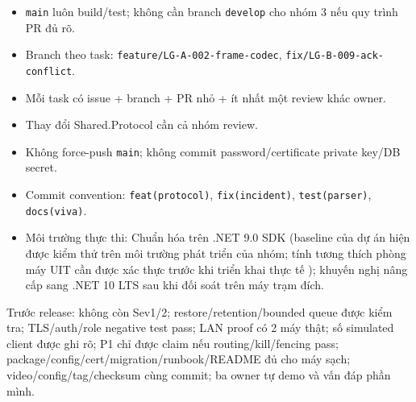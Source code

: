 \begin{itemize}
    \item \texttt{main} luôn build/test; không cần branch \texttt{develop} cho nhóm 3 nếu quy trình PR đủ rõ.
    \item Branch theo task: \texttt{feature/LG-A-002-frame-codec}, \texttt{fix/LG-B-009-ack-conflict}.
    \item Mỗi task có issue + branch + PR nhỏ + ít nhất một review khác owner.
    \item Thay đổi Shared.Protocol cần cả nhóm review.
    \item Không force-push \texttt{main}; không commit password/certificate private key/DB secret.
    \item Commit convention: \texttt{feat(protocol)}, \texttt{fix(incident)}, \texttt{test(parser)}, \texttt{docs(viva)}.
    \item Môi trường thực thi: Chuẩn hóa trên .NET 9.0 SDK (baseline của dự án hiện được kiểm thử trên môi trường phát triển của nhóm; tính tương thích phòng máy UIT cần được xác thực trước khi triển khai thực tế \cite{mslearn_dotnet_support}); khuyến nghị nâng cấp sang .NET 10 LTS sau khi đối soát trên máy trạm đích.
\end{itemize}

Trước release: không còn Sev1/2; restore/retention/bounded queue được kiểm tra; TLS/auth/role negative test pass; LAN proof có 2 máy thật; số simulated client được ghi rõ; P1 chỉ được claim nếu routing/kill/fencing pass; package/config/cert/migration/runbook/README đủ cho máy sạch; video/config/tag/checksum cùng commit; ba owner tự demo và vấn đáp phần mình.
